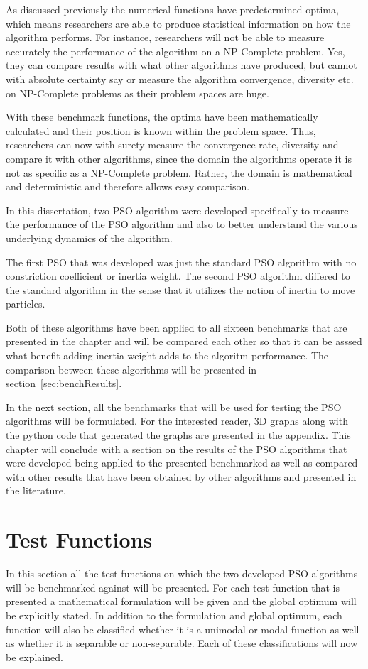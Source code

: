 As discussed previously the numerical functions have predetermined optima, which means researchers are able to produce statistical information on how the algorithm performs. For instance, researchers will not be able to measure accurately the performance of the algorithm on a NP-Complete problem\cite{CompuIntelligenceIntro,FundamentalSwarm}. Yes, they can compare results with what other algorithms have produced, but cannot with absolute certainty say or measure the algorithm convergence, diversity etc. on NP-Complete problems as their problem spaces are huge\cite{evalevoalgo}. 

With these benchmark functions, the optima have been mathematically calculated and their position is known within the problem space\cite{evalevoalgo}. Thus, researchers can now with surety measure the convergence rate, diversity and compare it with other algorithms, since the domain the algorithms operate it is not as specific as a NP-Complete problem\cite{evalevoalgo}. Rather, the domain is mathematical and deterministic and therefore allows easy comparison\cite{evalevoalgo}.

In this dissertation, two PSO algorithm were developed specifically to measure the performance of the PSO algorithm and also to better understand the various underlying dynamics of the algorithm.

The first PSO that was developed was just the standard PSO algorithm with no constriction coefficient or inertia weight. The second PSO algorithm differed to the standard algorithm in the sense that it utilizes the notion of inertia to move particles. 

Both of these algorithms have been applied to all sixteen benchmarks that are presented in the chapter and will be compared each other so that it can be asssed what benefit adding inertia weight adds to the algoritm performance. The comparison between these algorithms will be presented in section~\ref{sec:benchResults}.

In the next section, all the benchmarks that will be used for testing the PSO algorithms will be formulated. For the interested reader, 3D graphs along with the python code that generated the graphs are presented in the appendix. This chapter will conclude with a section on the results of the PSO algorithms that were developed being applied to the presented benchmarked as well as compared with other results that have been obtained by other algorithms and presented in the literature.
\section{Test Functions}
In this section all the test functions on which the two developed PSO algorithms will be benchmarked against will be presented. For each test function that is presented a mathematical formulation will be given and the global optimum will be explicitly stated. In addition to the formulation and global optimum, each function will also be classified whether it is a unimodal or modal function as well as whether it is separable or non-separable. Each of these classifications will now be explained.

